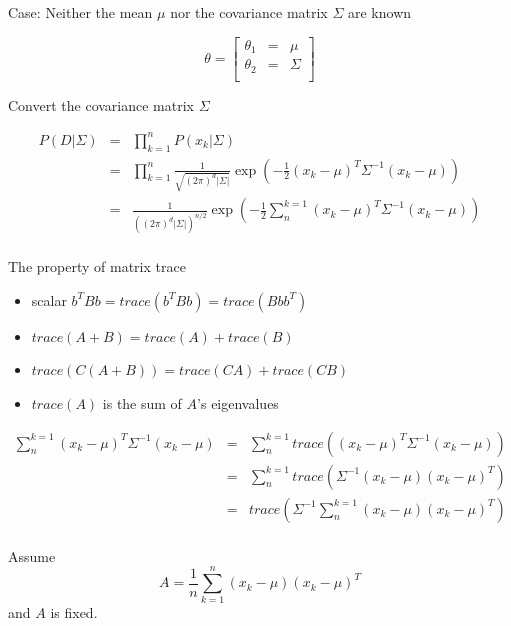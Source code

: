 \documentclass[letterpaper,10pt]{article}
\begin{document}
Case: Neither the mean $\mu$ nor the covariance matrix $\Sigma$ are known

\begin{equation}
\theta=\left[\begin{array}{rcl}
\theta_1 & = & \mu \\
\theta_2 & = & \Sigma \\
\end{array}\right]
\end{equation}

Convert the covariance matrix $\Sigma$

\begin{equation}
\begin{array}{rcl}
P(D|\Sigma) & = & \prod_{k=1}^{n}{P(x_k|\Sigma)} \\
			& = & \prod_{k=1}^{n}{\frac{1}{\sqrt{(2\pi)^d|\Sigma|}}\exp(-\frac{1}{2}(x_k-\mu)^T\Sigma^{-1}(x_k-\mu))} \\
			& = & \frac{1}{((2\pi)^d|\Sigma|)^{n/2}}\exp(-\frac{1}{2}\sum_{n}^{k=1}{(x_k-\mu)^T\Sigma^{-1}(x_k-\mu)}) \\
\end{array}
\end{equation}

The property of matrix trace 
\begin{itemize}
	\item scalar $b^TBb=trace(b^TBb)=trace(Bbb^T)$
	\item $trace(A+B)=trace(A)+trace(B)$
	\item $trace(C(A+B))=trace(CA)+trace(CB)$
	\item $trace(A)$ is the sum of $A$'s eigenvalues
\end{itemize}

\begin{equation}
\begin{array}{rcl}
\sum_{n}^{k=1}{(x_k-\mu)^T\Sigma^{-1}(x_k-\mu)} & = & \sum_{n}^{k=1}{trace((x_k-\mu)^T\Sigma^{-1}(x_k-\mu))} \\
												& = & \sum_{n}^{k=1}{trace(\Sigma^{-1}(x_k-\mu)(x_k-\mu)^T)} \\
												& = & trace(\Sigma^{-1}\sum_{n}^{k=1}{(x_k-\mu)(x_k-\mu)^T})\\												
\end{array}
\end{equation}

Assume
\begin{equation}
A=\frac{1}{n}\sum_{k=1}^{n}(x_k-\mu)(x_k-\mu)^T
\end{equation}
and $A$ is fixed.
\end{document}
